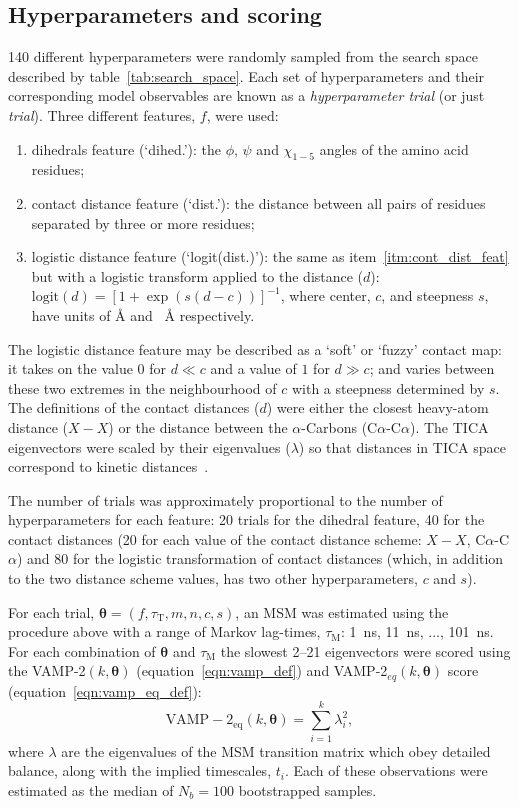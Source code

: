 \documentclass[journal=jacsat,manuscript=article]{achemso}
\begin{document}
\subsection{Hyperparameters and scoring}
\num{140} different hyperparameters were randomly sampled from the search space described by table~\ref{tab:search_space}. Each set of hyperparameters and their corresponding model observables are known as a \emph{hyperparameter trial} (or just \emph{trial}). Three different features, $f$, were used: 
\begin{enumerate}
    \item dihedrals feature (`dihed.'): the $\phi$, $\psi$ and $\chi_{1-5}$ angles of the amino acid residues;
    \item contact distance feature (`dist.'): the distance between all pairs of residues separated by three or more residues; \label{itm:cont_dist_feat}
    \item logistic distance feature (`logit(dist.)'): the same as item~\ref{itm:cont_dist_feat} but with a logistic transform applied to the distance ($d$): $\mathrm{logit}(d) = [1+\exp{(s(d-c))}]^{-1}$, where center, $c$, and steepness $s$,  have units of \si{\angstrom} and \si{\per\angstrom} respectively.
\end{enumerate}
The logistic distance feature may be described as a `soft' or `fuzzy' contact map: it takes on the value $0$ for $d \ll c$ and a value of $1$ for $d\gg c$; and varies between these two extremes in the neighbourhood of $c$ with a steepness determined by $s$. The definitions of the contact distances ($d$) were either the closest heavy-atom distance ($X-X$) or the distance between the $\alpha$-Carbons (C$\alpha$-C$\alpha$). The TICA eigenvectors were scaled by their eigenvalues ($\lambda$) so that distances in TICA space correspond to kinetic distances~\cite{noeKineticDistanceKinetic2015}.

The number of trials was approximately proportional to the number of hyperparameters for each feature: 20 trials for the dihedral feature, 40 for the contact distances (20 for each value of the contact distance scheme: $X-X$,  C$\alpha$-C$\alpha$) and 80 for the logistic transformation of contact distances (which, in addition to the two distance scheme values, has two other hyperparameters, $c$ and $s$). 

For each trial,  $\bm{\theta} = (f, \tau_{\mathrm{T}}, m, n, c, s)$,  an MSM was estimated using the procedure above with a range of Markov lag-times, $\tau_{\mathrm{M}}$: \SI{1}{\nano\second}, \SI{11}{\nano\second}, ..., \SI{101}{\nano\second}. For each combination of $\bm{\theta}$ and  $\tau_{\mathrm{M}}$ the slowest \numrange{2}{21} eigenvectors were scored using the VAMP-2$(k, \bm{\theta})$ (equation~\ref{eqn:vamp_def}) and  VAMP-2$_{eq}(k, \bm{\theta})$ score (equation~\ref{eqn:vamp_eq_def}):
\begin{equation}
    \operatorname{VAMP-2_{eq}}(k, \bm{\theta}) = \sum_{i=1}^{k}\lambda_{i}^{2}, \label{eqn:vamp_eq_def}
\end{equation}
where $\lambda$ are the eigenvalues of the MSM transition matrix which obey detailed balance, along with the implied timescales, $t_i$.  Each of these observations were estimated as the median of $N_b=100$ bootstrapped samples. 
\end{document}

